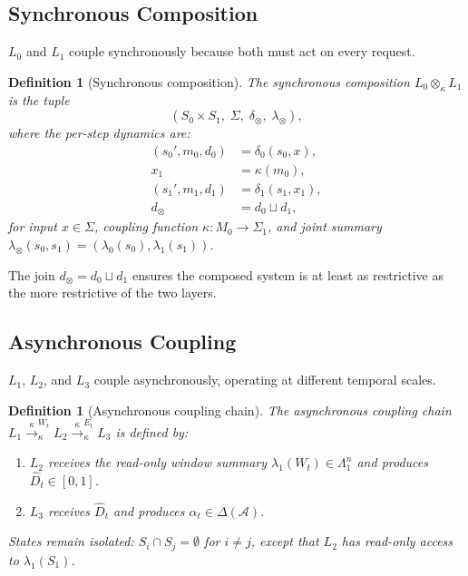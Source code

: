 \documentclass[11pt]{article}
\newtheorem{definition}[theorem]{Definition}
\newcommand{\Agents}{\mathcal{A}}
\newcommand{\Dhat}{\widehat{D}}
\newcommand{\Layer}[1]{L_{#1}}
\newcommand{\State}[1]{S_{#1}}
\newcommand{\Trans}[1]{\delta_{#1}}
\newcommand{\Sum}[1]{\lambda_{#1}}
\newcommand{\Comp}{\otimes_\kappa}
\newcommand{\AsyncComp}{\xrightarrow{\kappa}}
\newcommand{\join}{\sqcup}
\begin{document}
\subsection{Synchronous Composition}

$\Layer{0}$ and $\Layer{1}$ couple synchronously because both must act on
every request.

\begin{definition}[Synchronous composition]
\label{def:sync}
The \emph{synchronous composition} $\Layer{0} \Comp \Layer{1}$ is the tuple
\[
  (\State{0} \times \State{1},\; \Sigma,\; \Trans{\otimes},\; \Sum{\otimes}),
\]
where the per-step dynamics are:
\begin{align*}
  (s_0', m_0, d_0) &= \Trans{0}(s_0, x), \\
  x_1 &= \kappa(m_0), \\
  (s_1', m_1, d_1) &= \Trans{1}(s_1, x_1), \\
  d_\otimes &= d_0 \join d_1,
\end{align*}
for input $x \in \Sigma$, coupling function
$\kappa: M_0 \to \Sigma_1$, and joint summary
$\Sum{\otimes}(s_0, s_1) = (\Sum{0}(s_0), \Sum{1}(s_1))$.
\end{definition}

The join $d_\otimes = d_0 \join d_1$ ensures the composed system is at least
as restrictive as the more restrictive of the two layers.

\subsection{Asynchronous Coupling}

$\Layer{1}$, $\Layer{2}$, and $\Layer{3}$ couple asynchronously, operating
at different temporal scales.

\begin{definition}[Asynchronous coupling chain]
\label{def:async}
The \emph{asynchronous coupling chain}
$\Layer{1} \AsyncComp^{W_t}_\kappa \Layer{2} \AsyncComp^{E_t}_\kappa
\Layer{3}$ is defined by:
\begin{enumerate}[label=(\roman*),noitemsep]
  \item $\Layer{2}$ receives the read-only window summary
    $\Sum{1}(W_t) \in \Lambda_1^n$ and produces $\Dhat_t \in [0,1]$.
  \item $\Layer{3}$ receives $\Dhat_t$ and produces
    $\alpha_t \in \Delta(\Agents)$.
\end{enumerate}
States remain isolated: $\State{i} \cap \State{j} = \emptyset$ for $i \neq j$,
except that $\Layer{2}$ has read-only access to $\Sum{1}(\State{1})$.
\end{definition}
\end{document}
